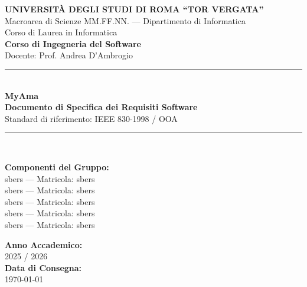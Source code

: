 \documentclass[12pt,a4paper]{article}
\begin{document}
\begin{titlepage}
    \centering
    \vspace*{1cm}
    
    {\Large \textbf{UNIVERSITÀ DEGLI STUDI DI ROMA ``TOR VERGATA''}}\\[0.3cm]
    {\large Macroarea di Scienze MM.FF.NN. --- Dipartimento di Informatica}\\[0.2cm]
    {\large Corso di Laurea in Informatica}\\[1.5cm]
    
    {\large \textbf{Corso di Ingegneria del Software}}\\[0.2cm]
    {\normalsize Docente: Prof. Andrea D'Ambrogio}\\[1.5cm]
    
    \rule{\linewidth}{0.8mm}\\[0.5cm]
    {\Huge \textbf{MyAma}}\\[0.3cm]
    {\Large \textbf{Documento di Specifica dei Requisiti Software}}\\[0.2cm]
    {\normalsize Standard di riferimento: IEEE 830-1998 / OOA}\\[0.5cm]
    \rule{\linewidth}{0.8mm}\\[2cm]
    
    \begin{minipage}{0.5\textwidth}
        \begin{flushleft} \large
            \textbf{Componenti del Gruppo:}\\
            sbers --- Matricola: sbers\\
            sbers --- Matricola: sbers\\
            sbers --- Matricola: sbers\\
            sbers --- Matricola: sbers\\
            sbers --- Matricola: sbers
        \end{flushleft}
    \end{minipage}
    \hfill
    \begin{minipage}{0.4\textwidth}
        \begin{flushright} \large
            \textbf{Anno Accademico:}\\
            2025 / 2026\\[1cm]
            \textbf{Data di Consegna:}\\
            \today
        \end{flushright}
    \end{minipage}
    
    \vfill
\end{titlepage}
\end{document}
